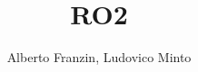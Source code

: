 \documentclass[a4paper,11pt]{report}
\author{Alberto Franzin, Ludovico Minto}
\title{RO2}
\begin{document}
\maketitle
\tableofcontents

\begin{abstract}
\end{abstract}




\end{document}

